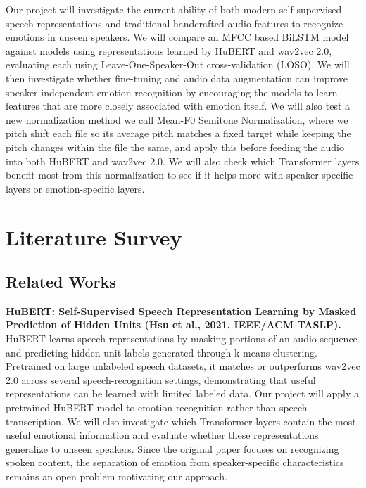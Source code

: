 \documentclass[11pt, letterpaper]{article}
\begin{document}
Our project will investigate the current ability of both modern self-supervised speech representations and traditional handcrafted audio features to recognize emotions in unseen speakers. We will compare an MFCC based BiLSTM model against models using representations learned by HuBERT and wav2vec 2.0, evaluating each using Leave-One-Speaker-Out cross-validation (LOSO). We will then investigate whether fine-tuning and audio data augmentation can improve speaker-independent emotion recognition by encouraging the models to learn features that are more closely associated with emotion itself. We will also test a new normalization method we call Mean-F0 Semitone Normalization, where we pitch shift each file so its average pitch matches a fixed target while keeping the pitch changes within the file the same, and apply this before feeding the audio into both HuBERT and wav2vec 2.0. We will also check which Transformer layers benefit most from this normalization to see if it helps more with speaker-specific layers or emotion-specific layers.

\section{Literature Survey}


\subsection{Related Works}


\textbf{HuBERT: Self-Supervised Speech Representation Learning by Masked Prediction of Hidden Units (Hsu et al., 2021, IEEE/ACM TASLP).} HuBERT learns speech representations by masking portions of an audio sequence and predicting hidden-unit labels generated through k-means clustering. Pretrained on large unlabeled speech datasets, it matches or outperforms wav2vec 2.0 across several speech-recognition settings, demonstrating that useful representations can be learned with limited labeled data. Our project will apply a pretrained HuBERT model to emotion recognition rather than speech transcription. We will also investigate which Transformer layers contain the most useful emotional information and evaluate whether these representations generalize to unseen speakers. Since the original paper focuses on recognizing spoken content, the separation of emotion from speaker-specific characteristics remains an open problem motivating our approach.
\end{document}
